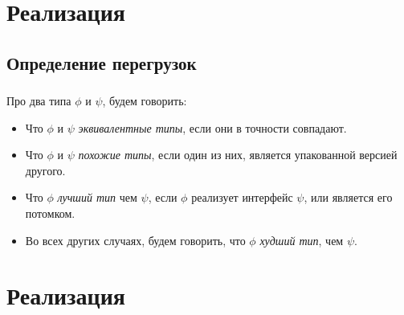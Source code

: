 \documentclass[t]{beamer}  %
\newcommand{\questionframe}[2]{
    \frame[c,plain]{
        \centering\huge
        \textbf{\structure{#1}}
        \par\bigskip
        #2
    }
}
\begin{document}
\questionframe{Вопросы? }{}

\section{Реализация}
\subsection{Определение перегрузок}
\begin{frame}
	\frametitle{\insertsection} 
    \begin{block}{}
Про два типа $\phi$ и $\psi$, будем говорить:
\begin{itemize}
    \item Что $\phi$ и $\psi$ \textit{эквивалентные типы}, если они в точности совпадают.
    \item Что $\phi$ и $\psi$ \textit{похожие типы}, если один из них, является упакованной версией другого.
    \item Что $\phi$ \textit{лучший тип} чем  $\psi$, если $\phi$ реализует интерфейс $\psi$, или является его потомком.
    \item Во всех других случаях, будем говорить, что $\phi$ \textit{худший тип}, чем $\psi$.
\end{itemize}
\end{block}
\end{frame}


\section{Реализация}
\end{document}
